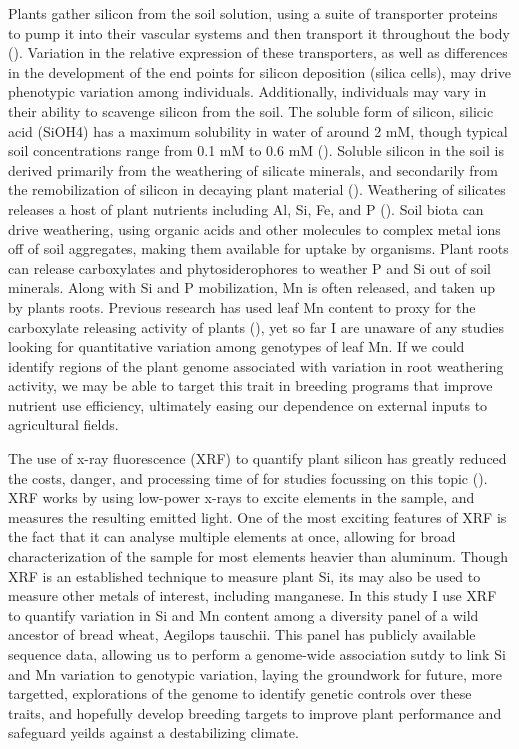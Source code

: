 \documentclass[12pt, letterpaper, ]{article}
\begin{document}
Plants gather silicon from the soil solution, using a suite of transporter proteins to pump it into their vascular systems and then transport it throughout the body (\cite{reynolds_silicon_2016}).  Variation in the relative expression of these transporters, as well as differences in the development of the end points for silicon deposition (silica cells), may drive phenotypic variation among individuals. Additionally, individuals may vary in their ability to scavenge silicon from the soil. The soluble form of silicon, silicic acid (SiOH4) has a maximum solubility in water of around 2 mM, though typical soil concentrations range from 0.1 mM to 0.6 mM (\cite{epstein_anomaly_1994}). Soluble silicon in the soil is derived primarily from the weathering of silicate minerals, and secondarily from the remobilization of silicon in decaying plant material (\cite{de_tombeur_silicon_2021-1}). Weathering of silicates releases a host of plant nutrients including Al, Si, Fe, and P (\cite{de_tombeur_silicon_2021-1}). Soil biota can drive weathering, using organic acids and other molecules to complex metal ions off of soil aggregates, making them available for uptake by organisms. Plant roots can release carboxylates and phytosiderophores to weather P and Si out of soil minerals. Along with Si and P mobilization, Mn is often released, and taken up by plants roots. Previous research has used leaf Mn content to proxy for the carboxylate releasing activity of plants (\cite{lambers_leaf_2015}), yet so far I are unaware of any studies looking for quantitative variation among genotypes of leaf Mn. If we could identify regions of the plant genome associated with variation in root weathering activity, we may be able to target this trait in breeding programs that improve nutrient use efficiency, ultimately easing our dependence on external inputs to agricultural fields. 

The use of x-ray fluorescence (XRF) to quantify plant silicon has greatly reduced the costs, danger, and processing time of for studies focussing on this topic (\cite{reidinger_rapid_2012}). XRF works by using low-power x-rays to excite elements in the sample, and measures the resulting emitted light. One of the most exciting features of XRF is the fact that it can analyse multiple elements at once, allowing for broad characterization of the sample for most elements heavier than aluminum. Though XRF is an established technique to measure plant Si, its may also be used to measure other metals of interest, including manganese. In this study I use XRF to quantify variation in Si and Mn content among a diversity panel of a wild ancestor of bread wheat, Aegilops tauschii. This panel has publicly available sequence data, allowing us to perform a genome-wide association sutdy to link Si and Mn variation to genotypic variation, laying the groundwork for future, more targetted, explorations of the genome to identify genetic controls over these traits, and hopefully develop breeding targets to improve plant performance and safeguard yeilds against a destabilizing climate.
\end{document}
